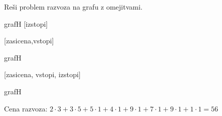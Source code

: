 \documentclass[14pt]{extarticle}
\begin{document}
Reši problem razvoza na grafu z omejitvami.

\begin{razvoz}[scale=0.8]{grafH}
    [izstopi]


    [zasicena,vstopi]
\end{razvoz}

\begin{razvoz}[scale=0.8]{grafH}


    [zasicena, vstopi, izstopi]
\end{razvoz}

\begin{razvoz}[scale=0.8]{grafH}

\end{razvoz}

Cena razvoza: $2 \cdot 3 + 3 \cdot 5 + 5 \cdot 1 + 4 \cdot 1 + 9 \cdot 1 + 7 \cdot 1 + 9 \cdot 1 + 1 \cdot 1 = 56$
\end{document}
